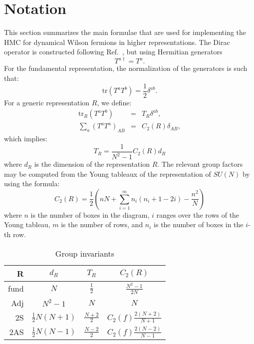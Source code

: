 \documentclass{article}[12pt]
\begin{document}
\section{Notation}
This section summarizes the main formulae that are used for
implementing the HMC for dynamical Wilson fermions in higher
representations. The Dirac operator is constructed following
Ref.~\cite{Luscher:1996sc}, but using Hermitian generators
%
\begin{equation}
T^{a\dagger}=T^a.
\end{equation}
%
For the fundamental representation, the normalization of the
generators is such that:
%
\begin{equation}
\mathrm{tr } \left(T^a T^b \right) = \frac12 \delta^{ab}.
\end{equation}
%
For a generic representation $R$, we define:
%
\begin{eqnarray}
\mathrm{tr }_R \left(T^a T^b \right) &=& T_R \delta^{ab}, \\
\sum_a \left(T^a T^a \right)_{AB} &=& C_2(R) \delta_{AB},
\end{eqnarray}
%
which implies:
%
\begin{equation}
T_R = \frac{1}{N^2-1} C_2(R) d_R
\end{equation}
%
where $d_R$ is the dimension of the representation $R$.
The relevant group factors may be computed from the Young tableaux of the
representation of $SU(N)$ by using the formula:
%
\begin{equation}
C_2(R) =\frac{1}{2}\left(nN+ \sum_{i=1}^{m} n_i \left( n_i+1-2i
\right) - \frac{n^2}{N}\right)
\end{equation}
%
where $n$ is the number of boxes in the diagram, $i$ ranges over the
rows of the Young tableau, $m$ is the number of rows, and $n_i$ is the
number of boxes in the $i$-th row.

\begin{table}[htp]
\begin{center}
\caption{Group invariants}
\label{table1}
\begin{tabular}{r|c|c|c}
R    & $d_R$               & $T_R$           & $C_2(R)$            \\
\hline
fund & $N$                 & $\frac12$       & $\frac{N^2-1}{2 N}$ \\
Adj  & $N^2-1$             & $N$             & $N$ \\
2S   & $\frac{1}{2}N(N+1)$ & $\frac{N+2}{2}$ & $C_2(f) \frac{2(N+2)}{N+1}$ \\
2AS  & $\frac{1}{2}N(N-1)$ & $\frac{N-2}{2}$ & $C_2(f)
\frac{2(N-2)}{N-1}$ \\
\hline
\end{tabular}
\end{center}
\end{table}
\end{document}
